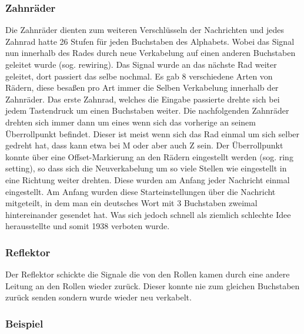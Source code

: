 \subsubsection{Zahnräder}
\label{sec:rader}
Die Zahnräder dienten zum weiteren Verschlüsseln der Nachrichten und jedes Zahnrad hatte 26 Stufen für jeden Buchstaben des Alphabets. Wobei das Signal nun innerhalb des Rades durch neue Verkabelung auf einen anderen Buchstaben geleitet wurde (sog. rewiring). Das Signal wurde an das nächste Rad weiter geleitet, dort passiert das selbe nochmal. Es gab 8 verschiedene Arten von Rädern, diese besaßen pro Art immer die Selben Verkabelung innerhalb der Zahnräder. Das erste Zahnrad, welches die Eingabe passierte drehte sich bei jedem Tastendruck um einen Buchstaben weiter. Die nachfolgenden Zahnräder drehten sich immer dann um eines wenn sich das vorherige an seinem Überrollpunkt befindet. Dieser ist meist wenn sich das Rad einmal um sich selber gedreht hat, dass kann etwa bei M oder aber auch Z sein. Der Überrollpunkt konnte über eine Offset-Markierung an den Rädern eingestellt werden (sog. ring setting), so dass sich die Neuverkabelung um so viele Stellen wie eingestellt in eine Richtung weiter drehten. Diese wurden am Anfang jeder Nachricht einmal eingestellt. Am Anfang wurden diese Starteinstellungen über die Nachricht mitgeteilt, in dem man ein deutsches Wort mit 3 Buchstaben zweimal hintereinander gesendet hat. Was sich jedoch schnell als ziemlich schlechte Idee herausstellte und somit 1938 verboten wurde.

\subsubsection{Reflektor}
Der Reflektor schickte die Signale die von den Rollen kamen durch eine andere Leitung an den Rollen wieder zurück. Dieser konnte nie zum gleichen Buchstaben zurück senden sondern wurde wieder neu verkabelt.

\subsubsection{Beispiel}

